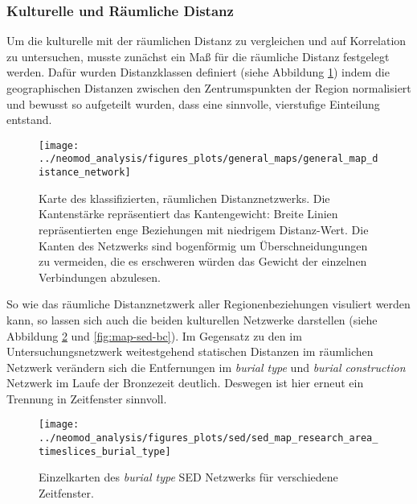 \documentclass[openany,twoside,twocolumn]{book}
\begin{document}
\hypertarget{kulturelle-und-raumliche-distanz}{%
\subsubsection{Kulturelle und Räumliche
Distanz}\label{kulturelle-und-raumliche-distanz}}

Um die kulturelle mit der räumlichen Distanz zu vergleichen und auf
Korrelation zu untersuchen, musste zunächst ein Maß für die räumliche
Distanz festgelegt werden. Dafür wurden Distanzklassen definiert (siehe
Abbildung \ref{fig:map-regions-distance-classes}) indem die
geographischen Distanzen zwischen den Zentrumspunkten der Region
normalisiert und bewusst so aufgeteilt wurden, dass eine sinnvolle,
vierstufige Einteilung entstand.

\begin{figure}
\texttt{[image: ../neomod\_analysis/figures\_plots/general\_maps/general\_map\_distance\_network]} \caption[Karte des klassifizierten, räumlichen Distanznetzwerks]{Karte des klassifizierten, räumlichen Distanznetzwerks. Die Kantenstärke repräsentiert das Kantengewicht: Breite Linien repräsentierten enge Beziehungen mit niedrigem Distanz-Wert. Die Kanten des Netzwerks sind bogenförmig um Überschneidungungen zu vermeiden, die es erschweren würden das Gewicht der einzelnen Verbindungen abzulesen.}\label{fig:map-regions-distance-classes}
\end{figure}

So wie das räumliche Distanznetzwerk aller Regionenbeziehungen visuliert
werden kann, so lassen sich auch die beiden kulturellen Netzwerke
darstellen (siehe Abbildung \ref{fig:map-sed-bt} und
\ref{fig:map-sed-bc}). Im Gegensatz zu den im Untersuchungsnetzwerk
weitestgehend statischen Distanzen im räumlichen Netzwerk verändern sich
die Entfernungen im \emph{burial type} und \emph{burial construction}
Netzwerk im Laufe der Bronzezeit deutlich. Deswegen ist hier erneut ein
Trennung in Zeitfenster sinnvoll.

\begin{landscape}
\begin{figure}
\texttt{[image: ../neomod\_analysis/figures\_plots/sed/sed\_map\_research\_area\_timeslices\_burial\_type]} \caption[Einzelkarten des \textit{burial type} SED Netzwerks für verschiedene Zeitfenster]{Einzelkarten des \textit{burial type} SED Netzwerks für verschiedene Zeitfenster.}\label{fig:map-sed-bt}
\end{figure}
\end{landscape}
\end{document}

